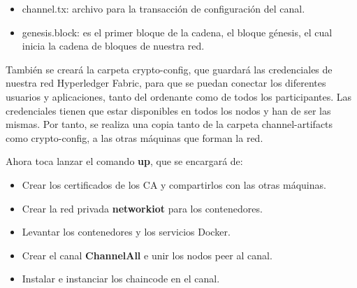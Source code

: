 \begin{itemize}
  \item channel.tx: archivo para la transacción de configuración del canal.
  \item genesis.block: es el primer bloque de la cadena, el bloque génesis, el cual inicia la cadena de bloques de 
  nuestra red.
\end{itemize}

\noindent También se creará la carpeta crypto-config, que guardará las credenciales de nuestra red Hyperledger Fabric, 
para que se puedan conectar los diferentes usuarios y aplicaciones, tanto del ordenante como de todos los 
participantes. Las credenciales tienen que estar disponibles en todos los nodos y han de ser las mismas. Por tanto, se 
realiza una copia tanto de la carpeta channel-artifacts como crypto-config, a las otras máquinas que forman la red.

\vspace{5mm}

\noindent Ahora toca lanzar el comando \textbf{up}, que se encargará de:

\begin{itemize}
  \item Crear los certificados de los CA y compartirlos con las otras máquinas.
  \item Crear la red privada \textbf{networkiot} para los contenedores.
  \item Levantar los contenedores y los servicios Docker.
  \item Crear el canal \textbf{ChannelAll} e unir los nodos peer al canal.
  \item Instalar e instanciar los chaincode en el canal.
\end{itemize}

